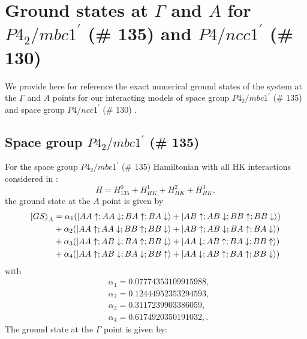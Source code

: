 \documentclass[prb,aps,amssymb,twocolumn,notitlepage]{revtex4-2}
\def\sg135{$P4_2/mbc1^\prime$ (\# 135)}
\def\sgb{$P4/ncc1^\prime$ (\# 130) }
\begin{document}
\section{Ground states at $\Gamma$ and $A$ for \sg135 and \sgb}
\label{sec:groundstates}
We provide here for reference the exact numerical ground states of the system at the $\Gamma$ and $A$ points for our interacting models of space group \sg135 and space group \sgb.
\subsection{Space group \sg135}
For the space group \sg135 Hamiltonian with all HK interactions considered in :
\begin{equation}
    H=H^{0}_{135}+H_{HK}^{1}+H_{HK}^{2}+H_{HK}^{3},
\end{equation}
the ground state at the $A$ point is given by
\begin{align}
    \ket{GS}_{A}&=\alpha_{1}(\ket{AA\uparrow;AA\downarrow;BA\uparrow;BA\downarrow}+\ket{AB\uparrow;AB\downarrow;BB\uparrow;BB\downarrow}) \\
    &+\alpha_{2}(\ket{AA\uparrow;AA\downarrow;BB\uparrow;BB\downarrow}+\ket{AB\uparrow;AB\downarrow;BA\uparrow;BA\downarrow}) \nonumber \\
    &+\alpha_{3}(\ket{AA\uparrow;AB\downarrow;BA\uparrow;BB\downarrow}+\ket{AA\downarrow;AB\uparrow;BA\downarrow;BB\uparrow}) \nonumber \\
    &+\alpha_{4}(\ket{AA\uparrow;AB\downarrow;BA\downarrow;BB\uparrow}+\ket{AA\downarrow;AB\uparrow;BA\uparrow;BB\downarrow}) \nonumber
\end{align}
with
\begin{align}
    &\alpha_{1}=0.07774353109915988, \nonumber \\
    &\alpha_{2}=0.12444952353294593, \nonumber\\
    &\alpha_{3}=0.3117239903386059, \nonumber \\
    &\alpha_{4}=0.6174920350191032, \nonumber.
\end{align}
The ground state at the $\Gamma$ point is given by:
\end{document}
